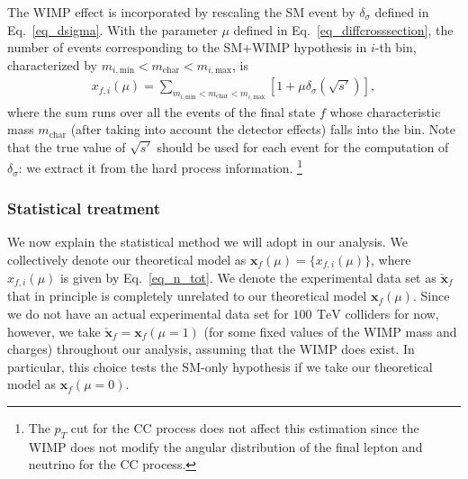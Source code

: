 \documentclass[12pt,twoside,book]{article}
\begin{document}
The WIMP effect is incorporated by rescaling the SM event by $\delta_\sigma$ defined in Eq.~\eqref{eq_dsigma}.
With the parameter $\mu$ defined in Eq.~\eqref{eq_diffcrosssection}, the number of events corresponding to the SM+WIMP hypothesis in $i$-th bin, characterized by $m_{i, \mathrm{min}} < m_{\mathrm{char}} < m_{i, \mathrm{max}}$, is
\begin{align}
  x_{f,i} (\mu) = \sum_{m_{i, \mathrm{min}} < m_{\mathrm{char}} < m_{i, \mathrm{max}}}
  \left[
    1 + \mu \delta_\sigma (\sqrt{s'})
  \right],
  \label{eq_n_tot}
\end{align}
where the sum runs over all the events of the final state $f$ whose characteristic mass $m_{\mathrm{char}}$ (after taking into account the detector effects) falls into the bin.
Note that the true value of $\sqrt{s'}$ should be used for each event for the computation of $\delta_\sigma$: we extract it from the hard process information.
\footnote{
	The $p_T$ cut for the CC process does not affect this estimation since the WIMP does not modify the angular distribution of the final lepton and neutrino for the CC process.
}


\subsubsection{Statistical treatment}
\label{sec_statistical}

We now explain the statistical method we will adopt in our analysis.
We collectively denote our theoretical model as $\bm{x}_f(\mu) = \{ x_{f,i} (\mu) \}$, where $x_{f,i}(\mu)$ is given by Eq.~\eqref{eq_n_tot}.
We denote the experimental data set as $\check{\bm{x}}_f$ that in principle is completely unrelated to our theoretical model $\bm{x}_f(\mu)$.
Since we do not have an actual experimental data set for $100~\,\mathrm{TeV}$ colliders for now, however, we take $\check{\bm{x}}_f = \bm{x}_f(\mu = 1)$ (for some fixed values of the WIMP mass and charges) throughout our analysis, assuming that the WIMP does exist.  In particular, this choice tests the SM-only hypothesis if we take our theoretical model as $\bm{x}_f(\mu=0)$.
\end{document}
